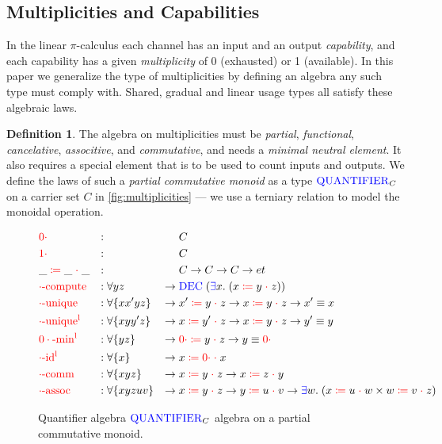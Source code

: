 \documentclass[a4paper,UKenglish,cleveref, autoref, thm-restate,authorcolumns]{lipics-v2019}
\theoremstyle{definition}
\newtheorem{nidefinition}[theorem]{Definition}
\newcommand{\picalc}{$\pi$-calculus}
\newcommand{\type}[1]{\textcolor{blue}{\operatorname{#1}}}
\newcommand{\field}[1]{\textcolor{red}{\operatorname{#1}}}
\newcommand{\op}[3]{#1 \; \field{\coloneqq} \; #2 \; \field{\cdot} \; #3}
\newcommand{\zero}{\field{0\cdot}}
\newcommand{\one}{\field{1\cdot}}
\newcommand{\Quantifier}{\type{QUANTIFIER}}
\begin{document}
\subsection{Multiplicities and Capabilities}
\label{multiplicities}

In the linear \picalc{} each channel has an input and an output \emph{capability}, and each capability has a given \emph{multiplicity} of 0 (exhausted) or 1 (available).
In this paper we generalize the type of multiplicities by defining an algebra any such type must comply with.
Shared, gradual and linear usage types all satisfy these algebraic laws.

\begin{nidefinition}
  The algebra on multiplicities must be \emph{partial}, \emph{functional}, \emph{cancelative}, \emph{associtive}, and \emph{commutative}, and needs a \emph{minimal neutral element}.
  It also requires a special element that is to be used to count inputs and outputs.
  We define the laws of such a \emph{partial commutative monoid} as a type $\Quantifier_C$ on a carrier set $C$ in \autoref{fig:multiplicities} --- we use a terniary relation to model the monoidal operation.
  
  \begin{figure}[h]
  \begin{equation}
  \begin{aligned}
    &\zero                  &:{} &                      &        & C \\
    &\one                   &:{} &                      &        & C \\
    &\op{\_}{\_}{\_}        &:{} &                      &        & C \to C \to C \to et \\
    &\field{\cdot-compute}  &:{} &\forall y z           & \to \; & \type{DEC} \; (\type{\exists} x . \; (\op{x}{y}{z})) \\
    &\field{\cdot-unique}   &:{} &\forall \{x x' y z\}  & \to \; & \op{x'}{y}{z} \to \op{x}{y}{z} \to x' \equiv x \\
    &\field{\cdot-unique^l} &:{} &\forall \{x y y' z\}  & \to \; & \op{x}{y'}{z} \to \op{x}{y}{z} \to y' \equiv y \\
    &\field{0\cdot-min^l}   &:{} &\forall \{y z\}       & \to \; & \op{\zero}{y}{z} \to y \equiv \zero \\
    &\field{\cdot-id^l}     &:{} &\forall \{x\}         & \to \; & \op{x}{\zero}{x} \\
    &\field{\cdot-comm}     &:{} &\forall \{x y z\}     & \to \; & \op{x}{y}{z} \to \op{x}{z}{y} \\
    &\field{\cdot-assoc}    &:{} &\forall \{x y z u v\} & \to \; & \op{x}{y}{z} \to \op{y}{u}{v} \to \type{\exists} w . \; (\op{x}{u}{w} \times \op{w}{v}{z})
  \end{aligned}
  \end{equation}
  \caption{Quantifier algebra $\Quantifier_C$ algebra on a partial commutative monoid.}
  \label{fig:multiplicities}
  \end{figure}
\end{nidefinition}
\end{document}
